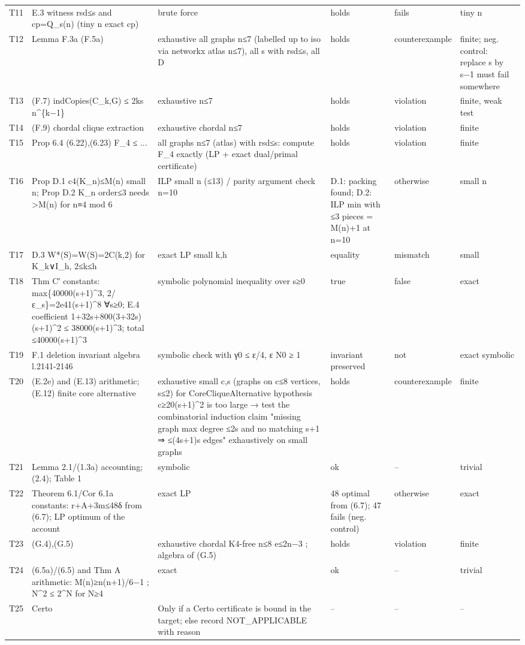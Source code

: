 \documentclass[
]{article}
\begin{document}
{\begin{longtable}[]{@{}llllll@{}}
T11 & E.3 witness rsd≤s and cp=Q\_s(n) (tiny n exact cp) & brute force &
holds & fails & tiny n \\
T12 & Lemma F.3a (F.5a) & exhaustive all graphs n≤7 (labelled up to iso
via networkx atlas n≤7), all s with rsd≤s, all D & holds &
counterexample & finite; neg. control: replace s by s−1 must fail
somewhere \\
T13 & (F.7) indCopies(C\_k,G) ≤ 2ks n\^{}\{k−1\} & exhaustive n≤7 &
holds & violation & finite, weak test \\
T14 & (F.9) chordal clique extraction & exhaustive chordal n≤7 & holds &
violation & finite \\
T15 & Prop 6.4 (6.22),(6.23) F\_4 ≤ ... & all graphs n≤7 (atlas) with
rsd≤s: compute F\_4 exactly (LP + exact dual/primal certificate) & holds
& violation & finite \\
T16 & Prop D.1 c4(K\_n)≤M(n) small n; Prop D.2 K\_n order≤3 needs
\textgreater M(n) for n≡4 mod 6 & ILP small n (≤13) / parity argument
check n=10 & D.1: packing found; D.2: ILP min with ≤3 pieces = M(n)+1 at
n=10 & otherwise & small n \\
T17 & D.3 W*(S)=W(S)=2C(k,2) for K\_k∨I\_h, 2≤k≤h & exact LP small k,h &
equality & mismatch & small \\
T18 & Thm C′ constants: max\{40000(s+1)\^{}3, 2/ε\_s\}=2e41(s+1)\^{}8
∀s≥0; E.4 coefficient 1+32s+800(3+32s)(s+1)\^{}2 ≤ 38000(s+1)\^{}3;
total ≤40000(s+1)\^{}3 & symbolic polynomial inequality over s≥0 & true
& false & exact \\
T19 & F.1 deletion invariant algebra l.2141-2146 & symbolic check with
γ0 ≤ ε/4, ε N0 ≥ 1 & invariant preserved & not & exact symbolic \\
T20 & (E.2e) and (E.13) arithmetic; (E.12) finite core alternative &
exhaustive small c,s (graphs on c≤8 vertices, s≤2) for
CoreCliqueAlternative hypothesis c≥20(s+1)\^{}2 is too large → test the
combinatorial induction claim "missing graph max degree ≤2s and no
matching s+1 ⇒ ≤(4s+1)s edges" exhaustively on small graphs & holds &
counterexample & finite \\
T21 & Lemma 2.1/(1.3a) accounting; (2.4); Table 1 & symbolic & ok & -- &
trivial \\
T22 & Theorem 6.1/Cor 6.1a constants: r+A+3m≤48δ from (6.7); LP optimum
of the account & exact LP & 48 optimal from (6.7); 47 fails (neg.
control) & otherwise & exact \\
T23 & (G.4),(G.5) & exhaustive chordal K4-free n≤8 e≤2n−3 ; algebra of
(G.5) & holds & violation & finite \\
T24 & (6.5a)/(6.5) and Thm A arithmetic: M(n)≥n(n+1)/6−1 ; N\^{}2 ≤
2\^{}N for N≥4 & exact & ok & -- & trivial \\
T25 & Certo & Only if a Certo certificate is bound in the target; else
record NOT\_APPLICABLE with reason & -- & -- & -- \\
\end{longtable}
}
\end{document}
